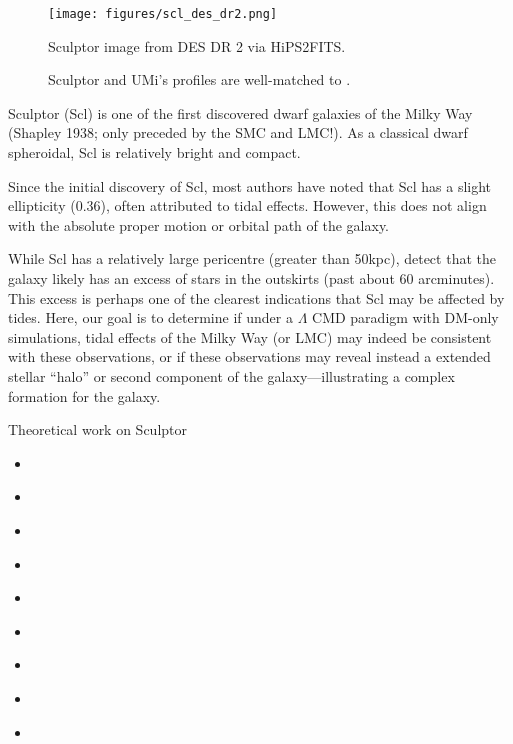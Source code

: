\begin{figure}
\centering
\texttt{[image: figures/scl\_des\_dr2.png]}
\caption[Picture of Sculptor]{Sculptor image from DES DR 2 via
HiPS2FITS.}\label{fig:scl_image}
\end{figure}

\begin{figure}
\centering
{}
\caption[Idealized simulations match Scl and UMi]{Sculptor and UMi's
profiles are well-matched to \citet{PNM2008}.}\label{fig:toy_profiles}
\end{figure}

Sculptor (Scl) is one of the first discovered dwarf galaxies of the
Milky Way (Shapley 1938; only preceded by the SMC and LMC!). As a
classical dwarf spheroidal, Scl is relatively bright and compact.

Since the initial discovery of Scl, most authors have noted that Scl has
a slight ellipticity (\(0.36\)), often attributed to tidal effects.
However, this does not align with the absolute proper motion or orbital
path of the galaxy.

While Scl has a relatively large pericentre (greater than 50kpc),
\citet{sestito+2023a} detect that the galaxy likely has an excess of
stars in the outskirts (past about 60 arcminutes). This excess is
perhaps one of the clearest indications that Scl may be affected by
tides. Here, our goal is to determine if under a \(\Lambda\) CMD
paradigm with DM-only simulations, tidal effects of the Milky Way (or
LMC) may indeed be consistent with these observations, or if these
observations may reveal instead a extended stellar ``halo'' or second
component of the galaxy---illustrating a complex formation for the
galaxy.

Theoretical work on Sculptor

\begin{itemize}
\tightlist
\item
  \citet{battaglia+2008}
\item
  \citet{iorio+2019}
\item
  \citet{amorisco+zavala+deboer2014}
\item
  \citet{battaglia+2008}
\item
  \citet{breddels+2013}
\item
  \citet{breddels+helmi2013}
\item
  \citet{richardson+fairbairn2014}
\item
  \citet{SFW2017}
\item
  \citet{innanen+papp1979}
\end{itemize}


